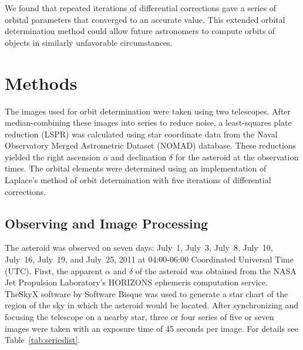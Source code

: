 \documentclass[12pt,journal,compsoc]{IEEEtran}
\begin{document}
We found that repeated iterations of differential corrections gave a series of orbital parameters that converged
to an accurate value. 
This extended orbital determination method could allow future astronomers to
compute orbits of objects in similarly unfavorable circumstances.

\section{Methods}
The images used for orbit determination were taken using two telescopes.
After median-combining these images into series to reduce noise, 
a least-squares plate reduction (LSPR) was calculated
using star coordinate data from the Naval Observatory Merged Astrometric Dataset (NOMAD) database. 
These reductions yielded the right ascension $\alpha$ and declination $\delta$ for the asteroid at the observation times.
The orbital elements were determined using an implementation of Laplace's method of orbit determination 
with five iterations of differential corrections.

\subsection{Observing and Image Processing}
The asteroid was observed on seven days: July~1, July~3, July~8, July~10, July~16, July~19, and July~25, 2011 
at 04:00-06:00 Coordinated Universal Time (UTC).
First, the apparent $\alpha$ and $\delta$ of the asteroid was obtained from the
NASA Jet Propulsion Laboratory's HORIZONS ephemeris computation service.
TheSkyX software by Software Bisque was used to generate a star chart of the region of the sky 
in which the asteroid would be located.
After synchronizing and focusing the telescope on a nearby star, 
three or four series of five or seven images were taken 
with an exposure time of 45 seconds per image. For details see Table~\ref{tab:serieslist}.
\end{document}
